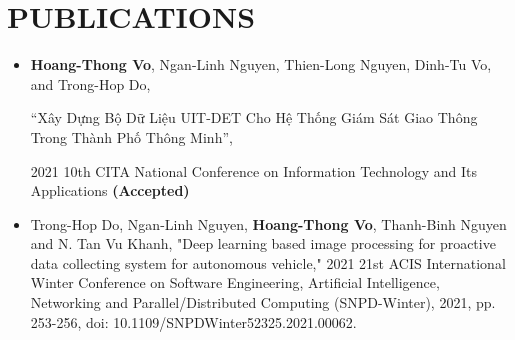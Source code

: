 \section{PUBLICATIONS}
\vspace{1mm}
\begin{itemize}[leftmargin=*]
    \item \textbf{Hoang-Thong Vo}, Ngan-Linh Nguyen, Thien-Long Nguyen, Dinh-Tu Vo, and Trong-Hop Do,
    \begin{otherlanguage}{vietnamese} 
     “Xây Dựng Bộ Dữ Liệu UIT-DET Cho Hệ Thống Giám Sát Giao Thông Trong Thành Phố Thông Minh”,
     \end{otherlanguage}
     2021 10th CITA National Conference on Information Technology and Its Applications \textbf{(Accepted)}
    
    \item Trong-Hop Do, Ngan-Linh Nguyen, \textbf{Hoang-Thong Vo}, Thanh-Binh Nguyen and N. Tan Vu Khanh, "Deep learning based image processing for proactive data collecting system for autonomous vehicle," 2021 21st ACIS International Winter Conference on Software Engineering, Artificial Intelligence, Networking and Parallel/Distributed Computing (SNPD-Winter), 2021, pp. 253-256, doi: 10.1109/SNPDWinter52325.2021.00062.
\end{itemize}